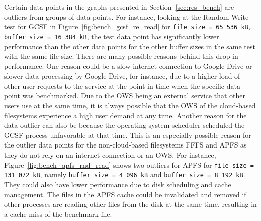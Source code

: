 Certain data points in the graphs presented in Section~\ref{sec:res_bench} are outliers from groups of data points. For instance, looking at the Random Write test for \gls{GCSF} in Figure~\ref{fig:bench_gcsf_re_read} for \texttt{file size = 65\,536\,kB, buffer size = 16\,384\,kB}, the test data point has significantly lower performance than the other data points for the other buffer sizes in the same test with the same file size. There are many possible reasons behind this drop in performance. One reason could be a slow internet connection to Google Drive or slower data processing by Google Drive, for instance, due to a higher load of other user requests to the service at the point in time when the specific data point was benchmarked. Due to the \gls{OWS} being an external service that other users use at the same time, it is always possible that the \gls{OWS} of the \mbox{cloud-based} filesystems experience a high user demand at any time. Another reason for the data outlier can also be because the operating system scheduler scheduled the \gls{GCSF} process unfavorable at that time. This is an especially possible reason for the outlier data points for the \mbox{non-cloud-based} filesystems \gls{FFFS} and \gls{APFS} as they do not rely on an internet connection or an \gls{OWS}. For instance, Figure~\ref{fig:bench_apfs_rnd_read} shows two outliers for \gls{APFS} for \texttt{file size = 131\,072\,kB}, namely \texttt{buffer size = 4\,096\,kB} and \texttt{buffer size = 8\,192\,kB}. They could also have lower performance due to disk scheduling and cache management. The files in the \gls{APFS} cache could be invalidated and removed if other processes are reading other files from the disk at the same time, resulting in a cache miss of the benchmark file.

